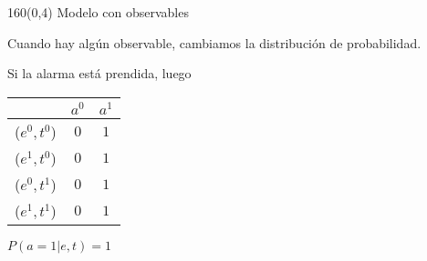 \documentclass[shownotes,aspectratio=169]{beamer}
\begin{document}
\begin{frame}[plain]
\begin{textblock}{160}(0,4)
 \centering \Large
Modelo con observables
\end{textblock}
\vspace{1.5} \centering

Cuando hay algún observable, cambiamos la distribución de probabilidad. \\

\vspace{0.5cm}

\pause

Si la alarma está prendida, luego \\

   \begin{tabular}{|c|c|c|}
        \hline
        & $a^0$ & $a^1$ \\ \hline
       ($e^0, t^0$) & $0$ & $1$  \\ \hline
       ($e^1, t^0$) & $0$ & $1$  \\ \hline
       ($e^0, t^1$) & $0$ & $1$  \\ \hline
       ($e^1, t^1$) & $0$ & $1$  \\ \hline
    \end{tabular}

    \vspace{0.3cm}
    
    $P(a=1|e,t) = 1$

\end{frame}
\end{document}
